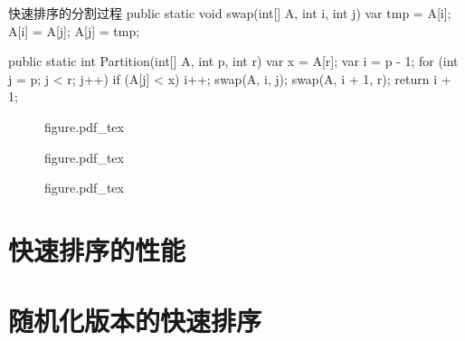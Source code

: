 \documentclass[oneside,10pt,fontset=none]{ctexbook}
\numberwithin{definition}{chapter}
\numberwithin{theorem}{chapter}
\numberwithin{lemma}{chapter}
\begin{document}
\begin{myjava}{}{快速排序的分割过程}{}
    public static void swap(int[] A, int i, int j) {
        var tmp = A[i];
        A[i] = A[j];
        A[j] = tmp;
    }

    public static int Partition(int[] A, int p, int r) {
        var x = A[r];
        var i = p - 1;
        for (int j = p; j < r; j++) {
            if (A[j] < x) {
                i++;
                swap(A, i, j);
            }
        }
        swap(A, i + 1, r);
        return i + 1;
    }
\end{myjava}

\begin{figure}[htbp]
    \centering
    \def\svgwidth{.8\columnwidth}
    {figure.pdf_tex}
\end{figure}

\begin{figure}[htbp]
    \def\svgwidth{\columnwidth}
    {figure.pdf_tex}
\end{figure}

\begin{figure}[htbp]
    \def\svgwidth{\columnwidth}
    {figure.pdf_tex}
\end{figure}

\section{快速排序的性能}

\section{随机化版本的快速排序}
\end{document}
